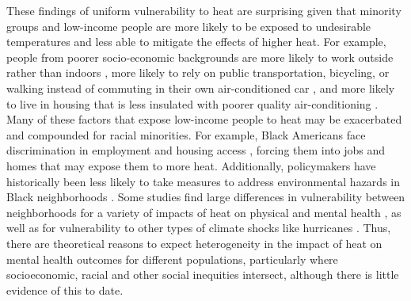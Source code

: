 \documentclass[fleqn,10pt]{wlscirep}
\begin{document}
These findings of uniform vulnerability to heat are surprising given that minority groups and low-income people are more likely to be exposed to undesirable temperatures and less able to mitigate the effects of higher heat. For example, people from poorer socio-economic backgrounds are more likely to work outside rather than indoors \cite{Gubernot2014Oct}, more likely to rely on public transportation, bicycling, or walking instead of commuting in their own air-conditioned car \cite{Karner2015Dec}, and more likely to live in housing that is less insulated with poorer quality air-conditioning \cite{Samuelson2020Jun}. Many of these factors that expose low-income people to heat may be exacerbated and compounded for racial minorities. For example, Black Americans face discrimination in employment \cite{Kang2016, Penner2008} and housing access \cite{Desmond2015, Akbar2019}, forcing them into jobs and homes that may expose them to more heat. Additionally, policymakers have historically been less likely to take measures to address environmental hazards in Black neighborhoods \cite{Banzhaf2019}. Some studies find large differences in vulnerability between neighborhoods for a variety of impacts of heat on physical and mental health \cite{Belanger2015Mar, Uejio2011Mar}, as well as for vulnerability to other types of climate shocks like hurricanes \cite{ferre2019hurricane, Gruebner2015Jun}. Thus, there are theoretical reasons to expect heterogeneity in the impact of heat on mental health outcomes for different populations, particularly where socioeconomic, racial and other social inequities intersect, although there is little evidence of this to date. 
\end{document}
